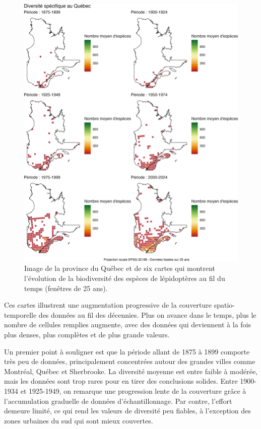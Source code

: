 \documentclass[9pt,twocolumn,twoside,]{pnas-new}
\begin{document}
\begin{figure}

\includegraphics[width=1\linewidth]{../Figures_analyse/cartes_combinees} \hfill{}

\caption{Image de la province du Québec et de six cartes qui montrent l'évolution de la biodiversité des espèces de lépidoptères au fil du temps (fenêtres de 25 ans).}\label{fig:fig_cartes_combinees, fullpage-figure}
\end{figure}

Ces cartes illustrent une augmentation progressive de la couverture
spatio-temporelle des données au fil des décennies. Plus on avance dans
le temps, plus le nombre de cellules remplies augmente, avec des données
qui deviennent à la fois plus denses, plus complètes et de plus grande
valeurs.

Un premier point à souligner est que la période allant de 1875 à 1899
comporte très peu de données, principalement concentrées autour des
grandes villes comme Montréal, Québec et Sherbrooke. La diversité
moyenne est entre faible à modérée, mais les données sont trop rares
pour en tirer des conclusions solides. Entre 1900-1934 et 1925-1949, on
remarque une progression lente de la couverture grâce à l'accumulation
graduelle de données d'échantillonnage. Par contre, l'effort demeure
limité, ce qui rend les valeurs de diversité peu fiables, à l'exception
des zones urbaines du sud qui sont mieux couvertes.
\end{document}
